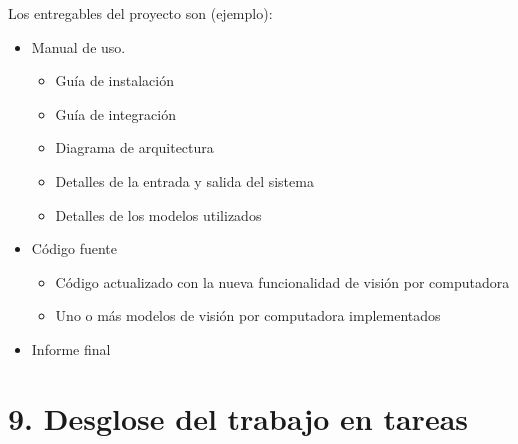 \documentclass[
11pt, %
codirector, %
]{charter}
\begin{document}
Los entregables del proyecto son (ejemplo):

\begin{itemize}
	\item Manual de uso.
	\begin{itemize}
	\item Guía de instalación
	\item Guía de integración
	\item Diagrama de arquitectura
	\item Detalles de la entrada y salida del sistema
	\item Detalles de los modelos utilizados
	\end{itemize}
	\item Código fuente
	\begin{itemize}
	\item Código actualizado con la nueva funcionalidad de visión por computadora
	\item Uno o más modelos de visión por computadora implementados
	\end{itemize}
	\item Informe final
\end{itemize}

\section{9. Desglose del trabajo en tareas}
\label{sec:wbs}
\end{document}
